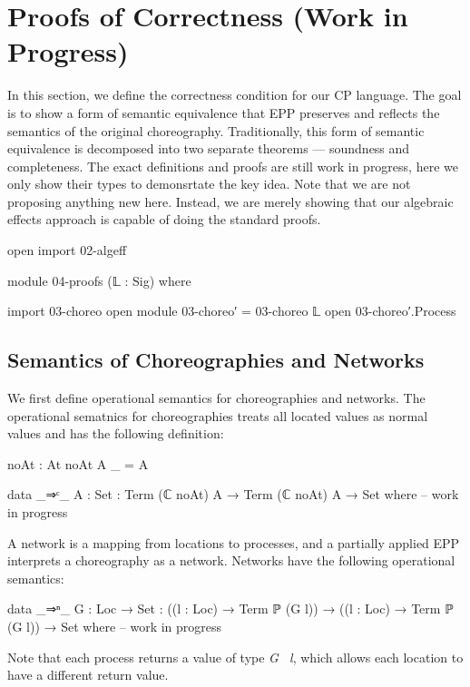 \section{Proofs of Correctness (Work in Progress)}

In this section, we define the correctness condition for our CP language.
%
The goal is to show a form of semantic equivalence that EPP preserves and reflects the semantics of the original choreography.
%
Traditionally, this form of semantic equivalence is decomposed into two separate theorems --- soundness and completeness.
%
The exact definitions and proofs are still work in progress, here we only show their types to demonsrtate the key idea.
%
Note that we are not proposing anything new here.
%
Instead, we are merely showing that our algebraic effects approach is capable of doing the standard proofs.

\begin{code}[hide]
open import 02-algeff

module 04-proofs (𝕃 : Sig) where

import 03-choreo
open module 03-choreo′ = 03-choreo 𝕃
open 03-choreo′.Process
\end{code}

\subsection{Semantics of Choreographies and Networks}

We first define operational semantics for choreographies and networks.
%
The operational sematnics for choreographies treats all located values as normal values and has the following definition:
%
\begin{center}\begin{code}
noAt : At
noAt A _ = A

data _⇒ᶜ_ {A : Set} : Term (ℂ noAt) A → Term (ℂ noAt) A → Set where
-- work in progress
\end{code}\end{center}
%
A network is a mapping from locations to processes, and a partially applied EPP interprets a choreography as a network.
%
Networks have the following operational semantics:
%
\begin{center}\begin{code}
data _⇒ⁿ_ {G : Loc → Set} :
  ((l : Loc) → Term ℙ (G l)) → ((l : Loc) → Term ℙ (G l)) → Set where
-- work in progress
\end{code}\end{center}
%
Note that each process returns a value of type \textit{G \ l}, which allows each location to have a different return value.

